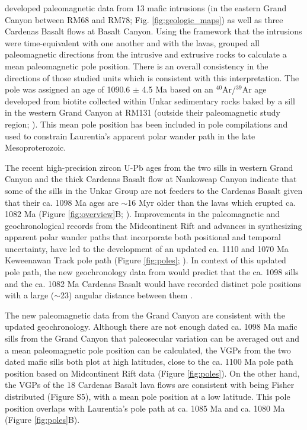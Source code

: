 developed paleomagnetic data from 13 mafic intrusions (in the eastern Grand Canyon between RM68 and RM78; Fig. \ref{fig:geologic_maps}) as well as three Cardenas Basalt flows at Basalt Canyon. Using the framework that the intrusions were time-equivalent with one another and with the lavas,  grouped all paleomagnetic directions from the intrusive and extrusive rocks to calculate a mean paleomagnetic pole position. There is an overall consistency in the directions of those studied units which is consistent with this interpretation. The pole was assigned an age of 1090.6 $\pm$ 4.5 Ma based on an $^{40}$Ar/$^{39}$Ar age developed from biotite collected within Unkar sedimentary rocks baked by a sill in the western Grand Canyon at RM131 (outside their paleomagnetic study region; ). This mean pole position has been included in pole compilations \cite[e.g.][]{Evans2021a} and used to constrain Laurentia's apparent polar wander path in the late Mesoproterozoic. 

The recent high-precision zircon U-Pb ages from the two sills in western Grand Canyon and the thick Cardenas Basalt flow at Nankoweap Canyon indicate that some of the sills in the Unkar Group are not feeders to the Cardenas Basalt given that their ca. 1098 Ma ages are $\sim$16 Myr older than the lavas which erupted ca. 1082 Ma (Figure \ref{fig:overview}B; ). Improvements in the paleomagnetic and geochronological records from the Midcontinent Rift \cite[e.g.][]{Tauxe2009a, Kulakov2013b, Fairchild2017a, Swanson-Hysell2019a} and advances in synthesizing apparent polar wander paths that incorporate both positional and temporal uncertainty, have led to the development of an updated ca. 1110 and 1070 Ma Keweenawan Track pole path (Figure \ref{fig:poles}; ). In context of this updated pole path, the new geochronology data from  would predict that the ca. 1098 sills and the ca. 1082 Ma Cardenas Basalt would have recorded distinct pole positions with a large ($\sim$23\textdegree) angular distance between them \cite{Swanson-Hysell2019a, Rose2022a}. 

The new paleomagnetic data from the Grand Canyon are consistent with the updated geochronology. Although there are not enough dated ca. 1098 Ma mafic sills from the Grand Canyon that paleosecular variation can be averaged out and a mean paleomagnetic pole position can be calculated, the VGPs from the two dated mafic sills both plot at high latitudes, close to the ca. 1100 Ma pole path position based on Midcontinent Rift data (Figure \ref{fig:poles}). On the other hand, the VGPs of the 18 Cardenas Basalt lava flows are consistent with being Fisher distributed (Figure S5), with a mean pole position at a low latitude. This pole position overlaps with Laurentia's pole path at ca. 1085 Ma and ca. 1080 Ma (Figure \ref{fig:poles}B). 


